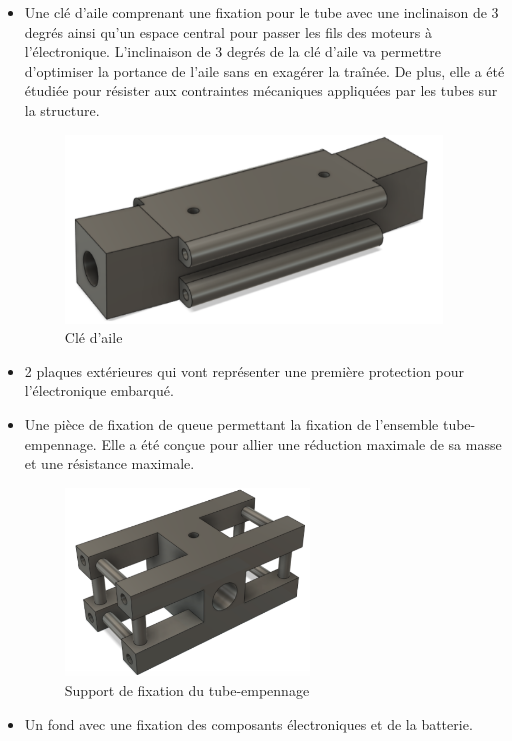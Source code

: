 \documentclass[a4paper,12pt,french]{report}
\begin{document}
\begin{itemize}
    \item Une clé d’aile comprenant une fixation pour le tube avec une inclinaison de 3 degrés ainsi qu’un espace central pour  passer les fils des moteurs à l'électronique. L'inclinaison de 3 degrés de la clé d'aile va permettre d’optimiser la portance de l’aile sans en exagérer la traînée. De plus, elle a été étudiée pour résister aux contraintes mécaniques appliquées par les tubes sur la structure.
          \begin{figure}[h]
              \centering
              \includegraphics[height=5cm]{figures/cle.png}
              \caption{Clé d'aile}
              \label{clé}
          \end{figure}
          \newpage
    \item 2 plaques extérieures qui vont représenter une première protection pour l’électronique embarqué.
    \item Une pièce de fixation de queue permettant la fixation de l’ensemble tube-empennage. Elle a été conçue pour allier une réduction maximale de sa masse et une résistance maximale.
          \begin{figure}[h]
              \centering
              \includegraphics[height=5cm]{figures/arr.png}
              \caption{Support de fixation du tube-empennage}
          \end{figure}
    \item Un fond avec une fixation des composants électroniques et de la batterie.
\end{itemize}
\end{document}
